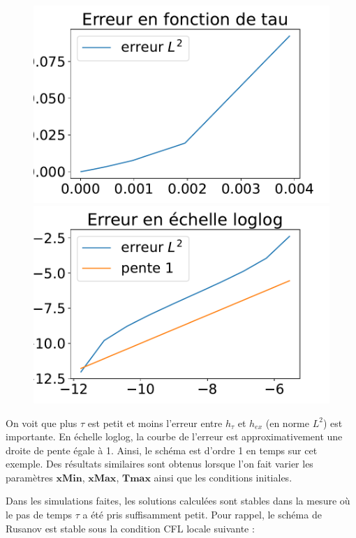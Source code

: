 \documentclass[
11pt, %
francais, %
singlespacing, %
headsepline, %
f%
]{MastersDoctoralThesis} %
\theoremstyle{definition}
\begin{document}
\begin{figure}
\includegraphics[scale = .6]{erreurtauL2}
\includegraphics[scale = .6]{erreurloglogtauL2} 
\end{figure}

On voit que plus $\tau$ est petit et moins l'erreur entre $h_{\tau}$ et $h_{ex}$ (en norme $L^{2}$) est importante. En échelle loglog, la courbe de l'erreur est approximativement une droite de pente égale à 1. Ainsi, le schéma est d'ordre 1 en temps sur cet exemple. Des résultats similaires sont obtenus lorsque l'on fait varier les paramètres $\textbf{xMin}$, $\textbf{xMax}$, $\textbf{Tmax}$ ainsi que les conditions initiales. 

Dans les simulations faites, les solutions calculées sont stables dans la mesure où le pas de temps $\tau$ a été pris suffisamment petit. Pour rappel, le schéma de Rusanov est stable sous la condition CFL locale suivante :
\end{document}
